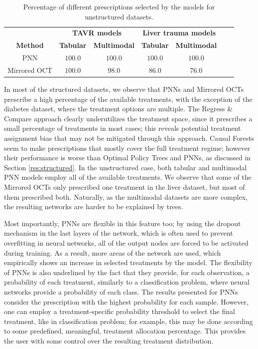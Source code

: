 \documentclass[10pt]{article} %
\begin{document}
\begin{table}[ht]\caption{Percentage of different prescriptions selected by the models for unstructured datasets.}\label{unstructured-perc}
\begin{center}
\begin{tabular}{ccccccc}
& \multicolumn{2}{c}{\textbf{TAVR models}} & \multicolumn{2}{c}{\textbf{Liver trauma models}} \\ 
\textbf{Method} & \textbf{Tabular} & \textbf{Multimodal} & \textbf{Tabular} & \textbf{Multimodal} \\ \midrule
PNN & $100.0$ & $100.0$  & $100.0$ & $100.0$ \\ 
Mirrored OCT & $100.0$ & $98.0$ & $86.0$ & $76.0$\\
\end{tabular}
\end{center}
\end{table}


In most of the structured datasets, we observe that PNNs and Mirrored OCTs prescribe a high percentage of the available treatments, with the exception of the diabetes dataset, where the treatment options are multiple. The Regress \& Compare approach clearly underutilizes the treatment space, since it prescribes a small percentage of treatments in most cases; this reveals potential treatment assignment bias that may not be mitigated through this approach. Causal Forests seem to make prescriptions that mostly cover the full treatment regime; however their performance is worse than Optimal Policy Trees and PNNs, as discussed in Section \ref{res:structured}. In the unstructured case, both tabular and multimodal PNN models employ all of the available treatments. We observe that some of the Mirrored OCTs only prescribed one treatment in the liver dataset, but most of them prescribed both. Naturally, as the multimodal datasets are more complex, the resulting networks are harder to be explained by trees.  


Most importantly, PNNs are flexible in this feature too; by using the dropout mechanism \citep{srivastava2014dropout} in the last layers of the network, which is often used to prevent overfitting in neural networks, all of the output nodes are forced to be activated during training. As a result, more areas of the network are used, which empirically shows an increase in selected treatments by the model. The flexibility of PNNs is also underlined by the fact that they provide, for each observation, a probability of each treatment, similarly to a classification problem, where neural networks provide a probability of each class. The results presented for PNNs consider the prescription with the highest probability for each sample. However, one can employ a treatment-specific probability threshold to select the final treatment, like in classification problem; for example, this may be done according to some predefined, meaningful, treatment allocation percentage. This provides the user with some control over the resulting treatment distribution.
\end{document}
